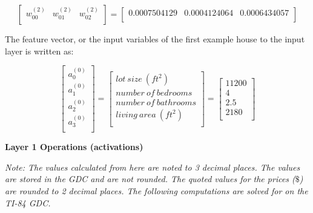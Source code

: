 \documentclass[12pt,a4paper]{article}
\begin{document}
\begin{mybox2}
\begin{equation}
\left[\begin{matrix}w_{00}^{\left(2\right)}&w_{01}^{\left(2\right)}&w_{02}^{\left(2\right)}\\\end{matrix}\right]=\left[\begin{matrix}0.0007504129&0.0004124064&0.0006434057\\\end{matrix}\right]
\end{equation}

\end{mybox2}


The feature vector, or the input variables of the first example house to the input layer is written as:

\begin{equation}
    \left[\begin{matrix}a_0^{(0)}\\a_1^{(0)}\\a_2^{(0)}\\ a_3^{(0)}\\\end{matrix}\right] = \left[\begin{matrix}lot \ size \ (ft^2) \\ number \  of \  bedrooms \\ number \ of \ bathrooms \\ living \ area \ (ft^2) \\\end{matrix}\right] = \left[\begin{matrix} 11200 \\  4 \\ 2.5 \\ 2180 \\\end{matrix}\right]
\end{equation}


\hspace{}

\textbf{Layer 1 Operations (activations)}

\textit{Note: The values calculated from here are noted to 3 decimal places. The values are stored in the GDC and are not rounded. The quoted values for the prices ($\$$) are rounded to 2 decimal places. The following computations are solved for on the TI-84 GDC.}
\end{document}
